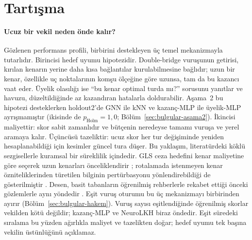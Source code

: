 \section{Tartışma}\label{sec:tartisma}

\paragraph{Ucuz bir vekil neden önde kalır?}
Gözlenen performans profili, birbirini destekleyen üç temel mekanizmayla tutarlıdır. Birincisi
hedef uyumu hipotezidir. Double-bridge vuruşunun getirisi, kırılan kenarın yerine daha kısa
bağlantılar kurulabilmesine bağlıdır; uzun bir kenar, özellikle uç noktalarının komşu ölçeğine
göre uzunsa, tam da bu kazancı vaat eder. Üyelik olasılığı ise ``bu kenar optimal turda mı?''
sorusunu yanıtlar ve havuzu, düzeltildiğinde az kazandıran hatalarla doldurabilir. Aşama~2 bu
hipotezi desteklerken holdout2'de GNN ile kNN ve kazanç-MLP ile üyelik-MLP ayrışmamıştır
(ikisinde de $p_{\mathrm{Holm}}=1{,}0$; Bölüm~\ref{sec:bulgular-asama2}).
İkincisi maliyettir: skor sabit zamanlıdır ve bütçenin neredeyse tamamı vuruşa ve yerel aramaya
kalır. Üçüncüsü tazeliktir: ucuz skor her tur değişiminde yeniden hesaplanabildiği için kesimler
güncel tura düşer. Bu yaklaşım, literatürdeki köklü sezgisellerle kuramsal bir süreklilik
içindedir. GLS ceza hedefini kenar maliyetine göre seçerek uzun kenarları önceliklendirir
\citep{voudouris_1999_gls}; rotalamada istenmeyen kenar özniteliklerinden türetilen bilginin
pertürbasyonu yönlendirebildiği de gösterilmiştir \citep{arnold_2019_kgls}. Desen, basit tabanların
öğrenilmiş rehberlerle rekabet ettiği önceki gözlemlerle aynı yöndedir
\citep{xia_2024_rethinking, bother_2022_wrong}.
Eşit vuruş oturumu bu üç mekanizmayı birbirinden ayırır (Bölüm~\ref{sec:bulgular-hakem}). Vuruş
sayısı eşitlendiğinde öğrenilmiş skorlar vekilden kötü değildir; kazanç-MLP ve NeuroLKH biraz öndedir.
Eşit süredeki sıralama bu yüzden ağırlıkla maliyet ve tazelikten doğar; hedef uyumu tek başına
vekilin üstünlüğünü açıklamaz.

